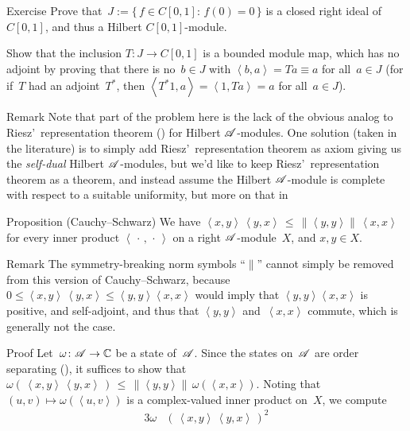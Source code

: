 \documentclass[a]{subfiles}
\begin{document}
\begin{parsec}
\begin{point}{Exercise}
Prove that~$J:=\{\,f\in C[0,1]\colon\, f(0)=0\,\}$
is a closed right ideal of~$C[0,1]$, and thus a
Hilbert $C[0,1]$-module.

Show that the inclusion $T\colon J\to C[0,1]$
is a bounded module map,
which has no adjoint
by proving that there is no~$b\in J$
with $\left<b,a\right>=Ta\equiv a$ for all~$a\in J$
(for if~$T$ had an adjoint~$T^*$,
then $\left<T^*1,a\right>=\left<1,Ta\right>=a$
for all~$a\in J$).

\begin{point}{Remark}%
Note that part of the problem here is the lack 
of the obvious analog to
Riesz'~representation theorem ()  
for Hilbert $\mathscr{A}$-modules.
One solution (taken in the literature) is to simply 
add Riesz'~representation theorem as axiom
giving us the \emph{self-dual} Hilbert $\mathscr{A}$-modules,
but we'd like to keep Riesz'~representation theorem as a theorem,
and instead assume the Hilbert $\mathscr{A}$-module
is complete with respect to a suitable uniformity,
but more on that in~
\end{point}
\end{point}
\begin{point}[chilb-cs]{Proposition (Cauchy--Schwarz)}%
	We have
$\left<x,y\right>\,\left<y,x\right>
\,\leq\,\left\|\left<y,y\right>\right\|\,\left<x,x\right>$
for every inner product $\left<\,\cdot\,,\,\cdot\,\right>$
on a right $\mathscr{A}$-module~$X$,
and $x,y\in X$.
\begin{point}{Remark}%
The symmetry-breaking norm symbols ``$\|$'' cannot simply 
be removed from this version of Cauchy--Schwarz,
because 
$0\leq \left<x,y\right>\,\left<y,x\right>
\leq \left<y,y\right>\left<x,x\right>$
would
imply
that $\left<y,y\right>\left<x,x\right>$
is positive, and self-adjoint,
and thus that $\left<y,y\right>$
and~$\left<x,x\right>$ commute,
which is generally not the case.
\end{point}
\begin{point}{Proof}%
Let~$\omega\colon \mathscr{A}\to \mathbb{C}$ be a state of~$\mathscr{A}$.
Since the states on~$\mathscr{A}$
are order separating (), 
it suffices to show that
$\omega(\,\left<x,y\right>\,\left<y,x\right>\,)
\,\leq\,\left\|\left<y,y\right>\right\|\,\omega(\left<x,x\right>)$.
Noting that $(u,v)\mapsto \omega(\left<u,v\right>)$
is a complex-valued inner product on~$X$,
we compute
\begin{alignat*}{3}
	\omega&(\,\left<x,y\right>\,\left<y,x\right>\,)^2\\

\end{alignat*}
\end{point}
\end{point}
\end{parsec}
\end{document}

